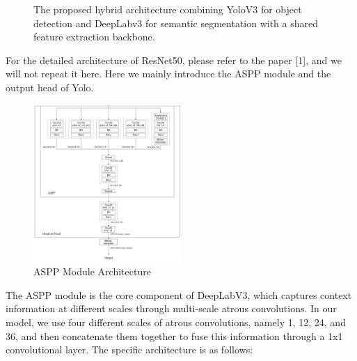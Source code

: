 \documentclass[conference]{IEEEtran}
\begin{document}
\begin{figure}[htbp]
    \caption{The proposed hybrid architecture combining YoloV3 for object detection and DeepLabv3 for semantic segmentation with a shared feature extraction backbone.}
    \label{fig:architecture}
\end{figure}


For the detailed architecture of ResNet50, please refer to the paper [1], and we will not repeat it here. Here we mainly introduce the ASPP module and the output head of Yolo.

\begin{figure}[htbp]
    \centering
    \centerline{\includegraphics[width=0.5\textwidth]{fig/aspp.png}}
    \caption{ASPP Module Architecture}
    \label{fig:aspp}
\end{figure}


The ASPP module is the core component of DeepLabV3, which captures context information at different scales through multi-scale atrous convolutions. In our model, we use four different scales of atrous convolutions, namely 1, 12, 24, and 36, and then concatenate them together to fuse this information through a 1x1 convolutional layer. The specific architecture is as follows:
\end{document}
